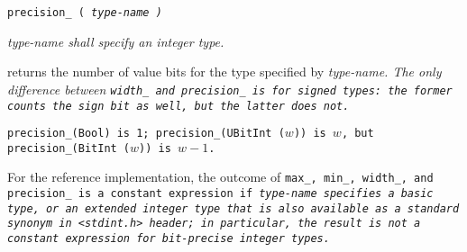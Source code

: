 
\tt{precision_ (} \it{type-name} \tt{)}


\it{type-name} shall specify an integer type.


 returns the number of value bits for the type specified by \it
{type-name}. The only difference between \tt{width_} and \tt{precision_} is for
signed types: the former counts the sign bit as well, but the latter does not.

\example \tt{precision_(Bool)} is 1; \tt{precision_(UBitInt (}$w$\tt{))}
is $w$, but \tt{precision_(BitInt (}$w$\tt{))} is ${w - 1}$.

\note For the reference implementation, the outcome of \tt{max_}, \tt{min_},
\tt{width_}, and \tt{precision_} is a constant expression if \it{type-name}
specifies a basic type, or an extended integer type that is also available
as a standard synonym in \tt{<stdint.h>} header; in particular,
the result is not a constant expression for bit-precise integer types.
